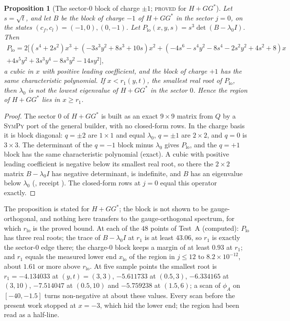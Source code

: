 \documentclass[11pt]{article}
\newtheorem{proposition}[theorem]{Proposition}
\theoremstyle{definition}
\theoremstyle{remark}
\newcommand{\PROVED}{\textsc{proved}}
\begin{document}
\begin{proposition}[The sector-$0$ block of charge $\pm1$; \PROVED{} for $H+GG^*$]\label{prop:lowblock}
Let $s=\sqrt t$, and let $B$ be the block of charge $-1$ of $H+GG^*$ in the sector $j=0$, on the states
$(c_f,c_l)=(-1,0),(0,-1)$. Let $P_{\mathrm{lo}}(x,y,s)=s^3\det(B-\lambda_0I)$. Then
\begin{multline*}
  P_{\mathrm{lo}}=2\bigl[(s^4+2s^2)x^3+(-3s^3y^2+8s^3+10s)x^2+(-4s^6-s^4y^2-8s^4-2s^2y^2+4s^2+8)x\\
  +4s^5y^2+3s^3y^4-8s^3y^2-14sy^2\bigr],
\end{multline*}
a cubic in $x$ with positive leading coefficient, and the block of charge $+1$ has the same characteristic polynomial.
If $x<r_1(y,t)$, the smallest real root of $P_{\mathrm{lo}}$, then $\lambda_0$ is not the lowest eigenvalue of
$H+GG^*$ in the sector $0$. Hence the region of $H+GG^*$ lies in $x\ge r_1$.
\end{proposition}
\begin{proof}
The sector $0$ of $H+GG^*$ is built as an exact $9\times9$ matrix from $Q$ by a \textsc{SymPy} port of the general
builder, with no closed-form rows. In the charge basis it is block diagonal: $q=\pm2$ are $1\times1$ and equal
$\lambda_0$, $q=\pm1$ are $2\times2$, and $q=0$ is $3\times3$. The determinant of the $q=-1$ block minus $\lambda_0$ gives
$P_{\mathrm{lo}}$, and the $q=+1$ block has the same characteristic polynomial (exact). A cubic with positive leading
coefficient is negative below its smallest real root, so there the $2\times2$ matrix $B-\lambda_0I$ has negative
determinant, is indefinite, and $B$ has an eigenvalue below $\lambda_0$ (,
receipt ). The closed-form rows at $j=0$ equal
this operator exactly.
\end{proof}

The proposition is stated for $H+GG^*$; the block is not shown to be gauge-orthogonal, and nothing here transfers to the
gauge-orthogonal spectrum, for which $r_{\mathrm{lo}}$ is the proved bound. At each of the $48$ points of Test~A
(computed): $P_{\mathrm{lo}}$ has three real roots; the trace of $B-\lambda_0I$ at $r_1$ is at least $43.06$, so $r_1$ is
exactly the sector-$0$ edge there; the charge-$0$ block keeps a margin of at least $0.93$ at $r_1$; and $r_1$ equals the
measured lower end $x_{\mathrm{lo}}$ of the region in $j\le12$ to $8.2\times10^{-12}$, about $1.61$ or more above
$r_{\mathrm{lo}}$. At five sample points the smallest root is $r_1=-4.134033$ at $(y,t)=(3,3)$, $-5.611733$ at
$(0.5,3)$, $-6.334165$ at $(3,10)$, $-7.514047$ at $(0.5,10)$ and $-5.759238$ at $(1.5,6)$; a scan of $\phi_A$ on
$[-40,-1.5]$ turns non-negative at about these values. Every scan before the present work stopped at $x=-3$, which hid the
lower end; the region had been read as a half-line.
\end{document}
